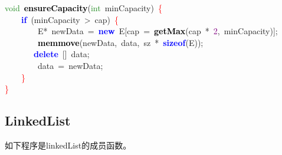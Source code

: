 \begin{center}\begin{minipage}{120mm}
\noindent
\mbox{}\textcolor{ForestGreen}{void}\ \textbf{\textcolor{Black}{ensureCapacity}}\textcolor{BrickRed}{(}\textcolor{ForestGreen}{int}\ minCapacity\textcolor{BrickRed}{)}\ \textcolor{Red}{\{}\  \\
\mbox{}\ \ \ \ \textbf{\textcolor{Blue}{if}}\ \textcolor{BrickRed}{(}minCapacity\ \textcolor{BrickRed}{\textgreater{}}\ cap\textcolor{BrickRed}{)}\ \textcolor{Red}{\{} \\
\mbox{}\ \ \ \ \ \ \ \ E\textcolor{BrickRed}{*}\ newData\ \textcolor{BrickRed}{=}\ \textbf{\textcolor{Blue}{new}}\ E\textcolor{BrickRed}{[}cap\ \textcolor{BrickRed}{=}\ \textbf{\textcolor{Black}{getMax}}\textcolor{BrickRed}{(}cap\ \textcolor{BrickRed}{*}\ \textcolor{Purple}{2}\textcolor{BrickRed}{,}\ minCapacity\textcolor{BrickRed}{)];} \\
\mbox{}\ \ \ \ \ \ \ \ \textbf{\textcolor{Black}{memmove}}\textcolor{BrickRed}{(}newData\textcolor{BrickRed}{,}\ data\textcolor{BrickRed}{,}\ sz\ \textcolor{BrickRed}{*}\ \textbf{\textcolor{Blue}{sizeof}}\textcolor{BrickRed}{(}E\textcolor{BrickRed}{));} \\
\mbox{} \ \ \ \ \ \ \ \textbf{\textcolor{Blue}{delete}}\ \textcolor{BrickRed}{[]}\ data\textcolor{BrickRed}{;} \\
\mbox{}\ \ \ \ \ \ \ \ data\ \textcolor{BrickRed}{=}\ newData\textcolor{BrickRed}{;} \\
\mbox{}\ \ \ \ \textcolor{Red}{\}} \\
\mbox{}\textcolor{Red}{\}}
\end{minipage}\end{center}

\subsection{LinkedList}
如下程序是linkedList的成员函数。


